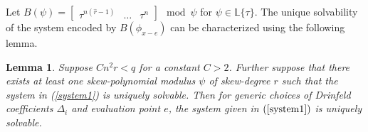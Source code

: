 \documentclass[sigconf]{acmart}
\newtheorem{lemma}{Lemma}
\renewcommand{\L}{\mathbb{L}}
\newcommand{\hatr}{\hat{r}}
\begin{document}
Let $ B(\psi) = \begin{bmatrix} \tau^{n(\hatr-1)} & \ldots & \tau^{n} \end{bmatrix} \mod \psi$ for $\psi \in \L\{\tau\}$. The unique solvability of the system encoded by $B(\phi_{x-e})$ can be characterized using the following lemma.



\begin{lemma}\label{detdeg}
Suppose $Cn^2r < q$ for a constant $C>2$. Further suppose that there exists at least one skew-polynomial modulus $\psi$ of skew-degree $r$ such that the system in (\ref{system1}) is uniquely solvable. Then for generic choices of Drinfeld coefficients $\Delta_i$ and evaluation point $e$, the system given in $(\ref{system1})$ is uniquely solvable.
\end{lemma}
\end{document}
